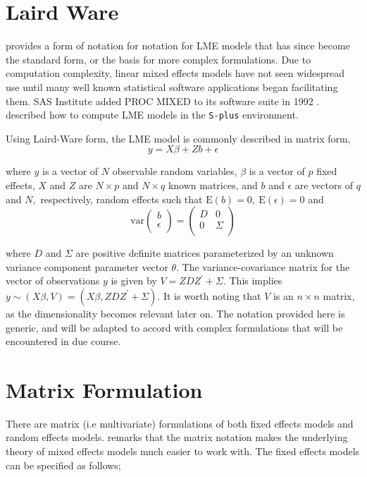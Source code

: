 \documentclass[MAIN.tex]{subfiles}
\begin{document}
\section{Laird Ware}
	\citet{LW82} provides a form of notation for notation for LME models that has since become the standard form, or the basis for more complex formulations. Due to computation complexity, linear mixed effects models have not seen widespread use until many well known statistical software applications began facilitating them. SAS Institute added PROC MIXED to its software suite in 1992 \citep{singer}. \citet{PB} described how to compute LME models in the \texttt{S-plus} environment.
	
	Using Laird-Ware form, the LME model is commonly described in matrix form,
	\begin{equation}
	y = X\beta + Zb + \epsilon
	\label{LW}
	\end{equation}
	
	\noindent where $y$ is a vector of $N$ observable random variables, $\beta$ is a vector of $p$ fixed effects, $X$ and $Z$ are $N \times p$ and $N \times q$ known matrices, and $b$ and $\epsilon$  are vectors of $q$ and $N,$ respectively, random effects such that $\mathrm{E}(b)=0, \ \mathrm{E}(\epsilon)=0$
	and
	\[
	\mathrm{var}
	\left(
	\begin{array}{c}
	b \\
	\epsilon \\
	\end{array}
	\right)
	=
	\left(
	\begin{array}{cc}
	D & 0 \\
	0 & \Sigma \\
	\end{array}
	\right)
	\]
	
	
	
	
	where $D$ and $\Sigma$ are positive definite matrices parameterized by an unknown variance component parameter vector $ \theta.$ The variance-covariance matrix for the vector of observations $y$ is given by $V = ZDZ^{\prime}+ \Sigma.$ This implies $y \sim(X\beta, V) = (X\beta,ZDZ^{\prime}+ \Sigma)$. It is worth noting that $V$ is an $n \times n$ matrix, as the dimensionality becomes relevant later on. The notation provided here is generic, and will be adapted to accord with complex formulations that will be encountered in due course.

\section{Matrix Formulation} There are matrix (i.e multivariate)
formulations of both fixed effects models and random effects
models. \citet{BrownPrescott} remarks that the matrix notation
makes the underlying theory of mixed effects models much easier to
work with. The fixed effects models can be specified as follows;
\end{document}
